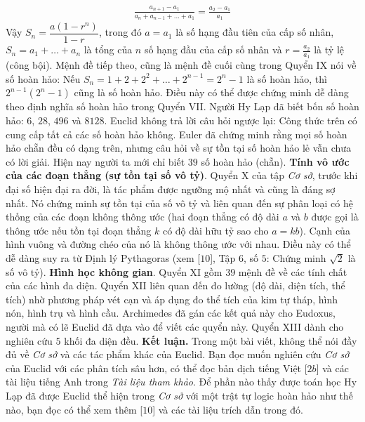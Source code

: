 \begin{multicols}{2}
	\begin{align*}
		\frac{a_{n+1} - a_1}{a_n + a_{n-1} + \ldots + a_1} = \frac{a_2 - a_1}{a_1}		
	\end{align*}
	Vậy  $S_n = \dfrac{a(1-r^n)}{1 -r}$,
	\vskip 0.1cm 
	trong đó $a = a_1$  là số hạng đầu tiên của cấp số nhân, $S_n = a_1 + \ldots + a_n$  là tổng của $n$  số hạng đầu của cấp số nhân và  $r = \frac{a_2}{a_1}$ là tỷ lệ (công bội).
	\vskip 0.1cm  
	Mệnh đề tiếp theo, cũng là mệnh đề cuối cùng trong Quyển IX nói về số hoàn hảo: Nếu  $S_n = 1 + 2 + 2^2 + \ldots + 2^{n-1} = 2^n -1$ là số hoàn hảo, thì  $2^{n-1}\left(2^n - 1\right)$ cũng là số hoàn hảo. Điều này có thể được chứng minh dễ dàng theo định nghĩa số hoàn hảo trong Quyển VII. Người Hy Lạp đã biết bốn số hoàn hảo: $6$, $28$, $496$ và $8128$.  Euclid không trả lời câu hỏi ngược lại: Công thức trên có cung cấp tất cả các số hoàn hảo không. Euler đã chứng minh rằng mọi số hoàn hảo chẵn đều có dạng trên, nhưng câu hỏi về sự tồn tại số hoàn hảo lẻ vẫn chưa có lời giải. Hiện nay người ta mới chỉ biết $39$ số hoàn hảo (chẵn).
	\vskip 0.1cm
	\textbf{\color{lichsutoanhoc}Tính vô ước của các đoạn thẳng (sự tồn tại số vô tỷ)}. Quyển X của tập \textit{Cơ sở}, trước khi đại số hiện đại ra đời, là tác phẩm được ngưỡng mộ nhất và cũng là đáng sợ nhất. Nó chứng minh sự tồn tại của số vô tỷ và liên quan đến sự phân loại có hệ thống của các đoạn không thông ước (hai đoạn thẳng có độ dài $a$  và $b$  được gọi là thông ước nếu tồn tại đoạn thẳng $k$  có độ dài hữu tỷ sao cho  $a = kb$). Cạnh của hình vuông và đường chéo của nó là không thông ước với nhau. Điều này có thể dễ dàng suy ra từ Định lý Pythagoras (xem [$10$], Tập $6$, số $5$: Chứng minh $\sqrt{2}$ là số vô tỷ).
	\vskip 0.1cm
	\textbf{\color{lichsutoanhoc}Hình học không gian}. Quyển XI gồm $39$ mệnh đề về các tính chất của các hình đa diện. Quyển XII liên quan đến đo lường (độ dài, diện tích, thể tích)  nhờ phương pháp vét cạn và áp dụng đo thể tích của kim tự tháp, hình nón, hình trụ và hình cầu. Archimedes đã gán các kết quả này cho Eudoxus, người mà có lẽ Euclid đã dựa vào để viết các quyển này.  Quyển XIII dành cho nghiên cứu $5$ khối đa diện đều.   
	\vskip 0.1cm
	\textbf{\color{lichsutoanhoc}Kết luận.} Trong một bài viết, không thể nói đầy đủ về \textit{Cơ sở} và các tác phẩm khác của Euclid. Bạn đọc muốn nghiên cứu \textit{Cơ sở} của Euclid với các phân tích sâu hơn, có thể đọc bản dịch tiếng Việt [$2b$] và các tài liệu tiếng Anh trong \textit{Tài liệu tham khảo}. Để phần nào thấy được toán học Hy Lạp đã được Euclid thể hiện trong \textit{Cơ sở} với một trật tự logic hoàn hảo như thế nào, bạn đọc có thể xem thêm [$10$] và các tài liệu trích dẫn trong đó. 

\end{multicols}
